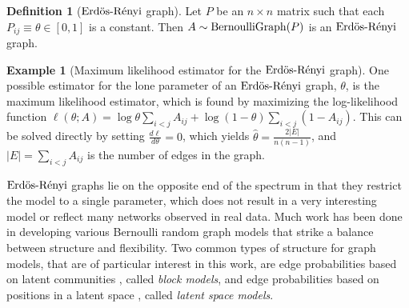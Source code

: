 \documentclass[
  12pt,
]{article}
\theoremstyle{definition}
\newtheorem{definition}{Definition}[section]
\theoremstyle{definition}
\newtheorem{example}{Example}[section]
\theoremstyle{definition}
\theoremstyle{definition}
\theoremstyle{remark}
\begin{document}
\begin{definition}[$\text{Erd\"{o}s-R\'{e}nyi}$ graph]
\label{def:erdos-renyi}
Let $P$ be an $n \times n$ matrix such that each $P_{ij} \equiv \theta \in [0, 1]$ is a constant. 
Then $A \sim \mathrm{BernoulliGraph}(P)$ is an $\text{Erd\"{o}s-R\'{e}nyi}$ graph. 
\end{definition}

\begin{example}[Maximum likelihood estimator for the $\text{Erd\"{o}s-R\'{e}nyi}$ graph]
One possible estimator for the lone parameter of an $\text{Erd\"{o}s-R\'{e}nyi}$ graph, $\theta$, is the maximum likelihood estimator, which is found by maximizing the log-likelihood function $\ell(\theta; A) = \log \theta \sum\limits_{i < j} A_{ij} + \log (1 - \theta) \sum\limits_{i < j} (1 - A_{ij})$. 
This can be solved directly by setting $\frac{d \ell}{d \theta} = 0$, which yields $\hat{\theta} = \frac{2 |E|}{n (n-1)}$, and $|E| = \sum_{i<j} A_{ij}$ is the number of edges in the graph.
\end{example}

\(\text{Erd\"{o}s-R\'{e}nyi}\) graphs lie on the opposite end of the spectrum in that they restrict the model to a single parameter, which does not result in a very interesting model or reflect many networks observed in real data.
Much work has been done in developing various Bernoulli random graph models that strike a balance between structure and flexibility.
Two common types of structure for graph models, that are of particular interest in this work, are edge probabilities based on latent communities \citep{doi:10.1080/0022250X.1971.9989788, NIPS2008_3578, Karrer_2011, 307cbeb9b1be48299388437423d94bf1}, called \emph{block models}, and edge probabilities based on positions in a latent space \citep{10.1007/978-3-540-77004-6_11, rubindelanchy2017statistical}, called \emph{latent space models}.
\end{document}
